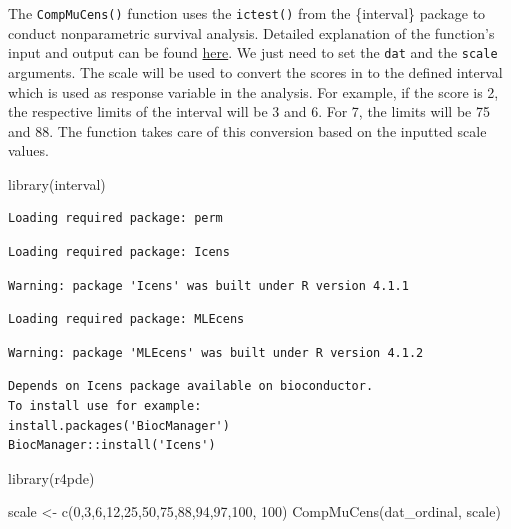 \documentclass[
  letterpaper,
]{book}
\newenvironment{Shaded}{\begin{snugshade}}{\end{snugshade}}
\newcommand{\DecValTok}[1]{\textcolor[rgb]{0.68,0.00,0.00}{#1}}
\newcommand{\FunctionTok}[1]{\textcolor[rgb]{0.28,0.35,0.67}{#1}}
\newcommand{\NormalTok}[1]{\textcolor[rgb]{0.00,0.23,0.31}{#1}}
\newcommand{\OtherTok}[1]{\textcolor[rgb]{0.00,0.23,0.31}{#1}}
\begin{document}
The \texttt{CompMuCens()} function uses the \texttt{ictest()} from the
\{interval\} package to conduct nonparametric survival analysis.
Detailed explanation of the function's input and output can be found
\href{https://github.com/StatisticalMethodsinPlantProtection/CompMuCens/blob/main/Supplementary\%20Data.pdf}{here}.
We just need to set the \texttt{dat} and the \texttt{scale} arguments.
The scale will be used to convert the scores in to the defined interval
which is used as response variable in the analysis. For example, if the
score is 2, the respective limits of the interval will be 3 and 6. For
7, the limits will be 75 and 88. The function takes care of this
conversion based on the inputted scale values.

\begin{Shaded}
\begin{Highlighting}[]
\FunctionTok{library}\NormalTok{(interval)}
\end{Highlighting}
\end{Shaded}

\begin{verbatim}
Loading required package: perm
\end{verbatim}

\begin{verbatim}
Loading required package: Icens
\end{verbatim}

\begin{verbatim}
Warning: package 'Icens' was built under R version 4.1.1
\end{verbatim}

\begin{verbatim}
Loading required package: MLEcens
\end{verbatim}

\begin{verbatim}
Warning: package 'MLEcens' was built under R version 4.1.2
\end{verbatim}

\begin{verbatim}
Depends on Icens package available on bioconductor. 
To install use for example:
install.packages('BiocManager')
BiocManager::install('Icens')
\end{verbatim}

\begin{Shaded}
\begin{Highlighting}[]
\FunctionTok{library}\NormalTok{(r4pde)}

\NormalTok{scale }\OtherTok{\textless{}{-}} \FunctionTok{c}\NormalTok{(}\DecValTok{0}\NormalTok{,}\DecValTok{3}\NormalTok{,}\DecValTok{6}\NormalTok{,}\DecValTok{12}\NormalTok{,}\DecValTok{25}\NormalTok{,}\DecValTok{50}\NormalTok{,}\DecValTok{75}\NormalTok{,}\DecValTok{88}\NormalTok{,}\DecValTok{94}\NormalTok{,}\DecValTok{97}\NormalTok{,}\DecValTok{100}\NormalTok{, }\DecValTok{100}\NormalTok{)}
\FunctionTok{CompMuCens}\NormalTok{(dat\_ordinal, scale)}
\end{Highlighting}
\end{Shaded}
\end{document}
